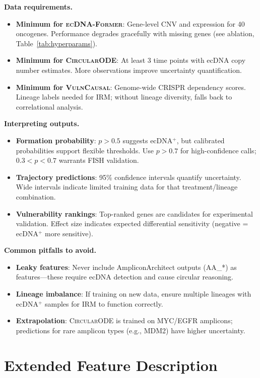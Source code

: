 \documentclass{article}
\newcommand{\former}{\textsc{ecDNA-Former}}
\newcommand{\circularode}{\textsc{CircularODE}}
\newcommand{\vulncausal}{\textsc{VulnCausal}}
\begin{document}
\textbf{Data requirements.}
\begin{itemize}[leftmargin=*, itemsep=2pt]
    \item \textbf{Minimum for \former{}}: Gene-level CNV and expression for 40 oncogenes. Performance degrades gracefully with missing genes (see ablation, Table~\ref{tab:hyperparams}).
    \item \textbf{Minimum for \circularode{}}: At least 3 time points with ecDNA copy number estimates. More observations improve uncertainty quantification.
    \item \textbf{Minimum for \vulncausal{}}: Genome-wide CRISPR dependency scores. Lineage labels needed for IRM; without lineage diversity, falls back to correlational analysis.
\end{itemize}

\textbf{Interpreting outputs.}
\begin{itemize}[leftmargin=*, itemsep=2pt]
    \item \textbf{Formation probability}: $p > 0.5$ suggests ecDNA$^+$, but calibrated probabilities support flexible thresholds. Use $p > 0.7$ for high-confidence calls; $0.3 < p < 0.7$ warrants FISH validation.
    \item \textbf{Trajectory predictions}: 95\% confidence intervals quantify uncertainty. Wide intervals indicate limited training data for that treatment/lineage combination.
    \item \textbf{Vulnerability rankings}: Top-ranked genes are candidates for experimental validation. Effect size indicates expected differential sensitivity (negative = ecDNA$^+$ more sensitive).
\end{itemize}

\textbf{Common pitfalls to avoid.}
\begin{itemize}[leftmargin=*, itemsep=2pt]
    \item \textbf{Leaky features}: Never include AmpliconArchitect outputs (AA\_*) as features---these require ecDNA detection and cause circular reasoning.
    \item \textbf{Lineage imbalance}: If training on new data, ensure multiple lineages with ecDNA$^+$ samples for IRM to function correctly.
    \item \textbf{Extrapolation}: \circularode{} is trained on MYC/EGFR amplicons; predictions for rare amplicon types (e.g., MDM2) have higher uncertainty.
\end{itemize}


\section{Extended Feature Description}
\label{app:features}
\end{document}
